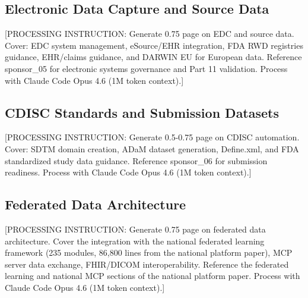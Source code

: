 \subsection{Electronic Data Capture and Source Data}

[PROCESSING INSTRUCTION: Generate 0.75 page on EDC and source data. Cover: EDC system
management, eSource/EHR integration, FDA RWD registries guidance, EHR/claims guidance,
and DARWIN EU for European data. Reference sponsor\_05 for electronic systems governance
and Part 11 validation. Process with Claude Code Opus 4.6 (1M token context).]

\subsection{CDISC Standards and Submission Datasets}

[PROCESSING INSTRUCTION: Generate 0.5-0.75 page on CDISC automation. Cover: SDTM domain
creation, ADaM dataset generation, Define.xml, and FDA standardized study data guidance.
Reference sponsor\_06 for submission readiness. Process with Claude Code Opus 4.6
(1M token context).]

\subsection{Federated Data Architecture}

[PROCESSING INSTRUCTION: Generate 0.75 page on federated data architecture. Cover the
integration with the national federated learning framework (235 modules, 86,800 lines
from the national platform paper), MCP server data exchange, FHIR/DICOM interoperability.
Reference the federated learning and national MCP sections of the national platform paper.
Process with Claude Code Opus 4.6 (1M token context).]
